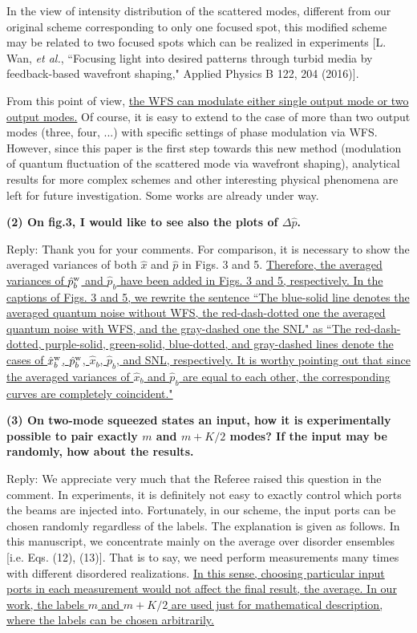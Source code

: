 \documentclass[10pt]{article}
\begin{document}
In the view of intensity distribution of the scattered modes, different from our original scheme corresponding to only one focused spot, this modified scheme may be related to two focused spots which can be realized in experiments [L. Wan, {\it{et al.}}, ``Focusing light into desired patterns through turbid media by feedback-based wavefront shaping," Applied Physics B 122, 204 (2016)].

From this point of view, {\uline{the WFS can modulate either single output mode or two output modes.}} Of course, it is easy to extend to the case of more than two output modes (three, four, ...) with specific settings of phase modulation via WFS. However, since this paper is the first step towards this new method (modulation of quantum fluctuation of the scattered mode via wavefront shaping), analytical results for more complex schemes and other interesting physical phenomena are left for future investigation. Some works are already under way.


{\bf{(2) On fig.3, I would like to see also the plots of $\Delta \hat{p}$.}}

Reply: Thank you for your comments. For comparison, it is necessary to show the averaged variances of both $\hat{x}$ and $\hat{p}$ in Figs. 3 and 5. {\uline{Therefore, the averaged variances of $\hat{p}^{\rm{w}}_b$ and $\hat{p}_b$ have been added in Figs. 3 and 5, respectively. In the captions of Figs. 3 and 5, we rewrite the sentence ``The blue-solid line denotes the averaged quantum noise without WFS, the red-dash-dotted one the averaged quantum noise with WFS, and the gray-dashed one the SNL" as ``The red-dash-dotted, purple-solid, green-solid, blue-dotted, and gray-dashed lines denote the cases of $\hat{x}_b^{\rm{w}}$, $\hat{p}_b^{\rm{w}}$, $\hat{x}_b$, $\hat{p}_b$, and SNL, respectively. It is worthy pointing out that since the averaged variances of $\hat{x}_b$ and $\hat{p}_b$ are equal to each other, the corresponding curves are completely coincident."}} 


{\bf{(3) On two-mode squeezed states an input, how it is experimentally possible to pair exactly $m$ and $m+K/2$ modes? If the input may be randomly, how about the results.}}

Reply:  We appreciate very much that the Referee raised this question in the comment. In experiments, it is definitely not easy to exactly control which ports the beams are injected into. Fortunately, in our scheme, the input ports can be chosen randomly regardless of the labels. The explanation is given as follows. In this manuscript, we concentrate mainly on the average over disorder ensembles [i.e. Eqs. (12), (13)]. That is to say, we need perform measurements many times with different disordered realizations. {\uline{In this sense, choosing particular input ports in each measurement would not affect the final result, the average. In our work, the labels $m$ and $m+K/2$ are used just for mathematical description, where the labels can be chosen arbitrarily.}}
\end{document}
